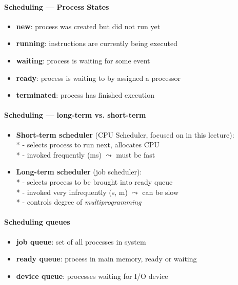 \paragraph{Scheduling --- Process States}
\begin{itemize}
  \item \textbf{new}: process was created but did not run yet
  \item \textbf{running}: instructions are currently being executed
  \item \textbf{waiting}: process is waiting for some event
  \item \textbf{ready}: process is waiting to by assigned a processor
  \item \textbf{terminated}: process has finished execution
\end{itemize}

\paragraph{Scheduling --- long-term vs. short-term}
\begin{itemize}
  \item \textbf{Short-term scheduler} (CPU Scheduler, focused on in this lecture): \\*
    - selects process to run next, allocates CPU \\*
    - invoked frequently (ms) \( \leadsto \) must be fast
  \item \textbf{Long-term scheduler} (job scheduler): \\*
    - selects process to be brought into ready queue \\*
    - invoked very infrequently (s, m) \( \leadsto \) can be slow \\*
    - controls degree of \emph{multiprogramming}
\end{itemize}

\paragraph{Scheduling queues}
\begin{itemize}
  \item \textbf{job queue}: set of all processes in system
  \item \textbf{ready queue}: process in main memory, ready or waiting
  \item \textbf{device queue}: processes waiting for I/O device
\end{itemize}

